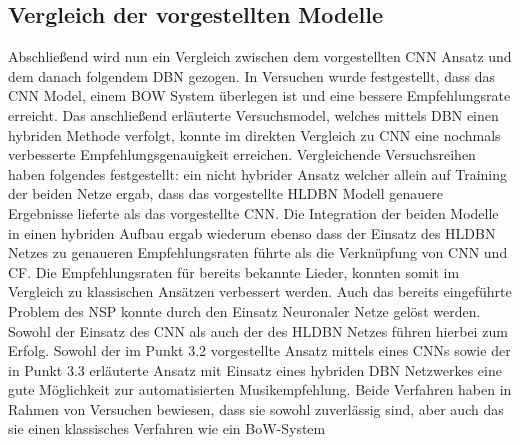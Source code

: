 \documentclass[twosided,a4,10pt]{article}
\begin{document}
\begin{multicols}{2}
		\section{Vergleich der vorgestellten Modelle}
		Abschließend wird nun ein Vergleich zwischen dem vorgestellten CNN Ansatz und dem danach folgendem DBN gezogen. In Versuchen \cite{oord} wurde festgestellt, dass das CNN Model, einem BOW System überlegen ist und eine bessere Empfehlungsrate erreicht. Das anschließend erläuterte  Versuchsmodel, welches mittels DBN einen hybriden Methode verfolgt, konnte im direkten Vergleich zu CNN eine nochmals verbesserte Empfehlungsgenauigkeit erreichen. Vergleichende Versuchsreihen \cite{wang} haben folgendes festgestellt: ein nicht hybrider Ansatz welcher allein auf Training der beiden Netze ergab, dass das vorgestellte HLDBN Modell genauere Ergebnisse lieferte als das vorgestellte CNN. Die Integration der beiden Modelle in einen hybriden Aufbau ergab wiederum ebenso dass der Einsatz des HLDBN Netzes zu genaueren Empfehlungsraten führte als die Verknüpfung von CNN und CF. Die Empfehlungsraten für bereits bekannte Lieder, konnten somit im Vergleich zu klassischen Ansätzen verbessert werden. Auch das bereits eingeführte Problem des NSP konnte durch den Einsatz Neuronaler Netze gelöst werden.  Sowohl der Einsatz des CNN als auch der des HLDBN Netzes führen hierbei zum Erfolg.
		Sowohl der im Punkt 3.2 vorgestellte Ansatz mittels eines CNNs sowie der in Punkt 3.3 erläuterte Ansatz mit Einsatz eines hybriden DBN Netzwerkes eine gute Möglichkeit zur automatisierten Musikempfehlung. Beide Verfahren haben in Rahmen von Versuchen bewiesen, dass sie sowohl zuverlässig sind, aber auch das sie einen klassisches Verfahren wie ein BoW-System 
		
		
	\end{multicols}
\end{document}
